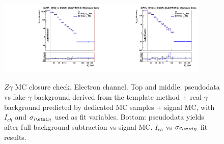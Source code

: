 \begin{figure}[htb]
\begin{center}
\includegraphics[width=0.45\textwidth]{../figs/figs_v11/ELECTRON_ZGamma/PrepareYields/c_BkgSubtrDATAvsSIGMC_c_ELECTRON_ZGamma__UNblind_MCclosure__Barrel__phoEt_MCclosure.pdf}\includegraphics[width=0.45\textwidth]{../figs/figs_v11/ELECTRON_ZGamma/PrepareYields/c_BkgSubtrDATAvsSIGMC_c_ELECTRON_ZGamma__UNblind_MCclosure__Endcap__phoEt_MCclosure.pdf}\\
  \caption{$Z\gamma$ MC closure check. Electron channel. Top and middle: pseudodata vs fake-$\gamma$ background derived from the template method + real-$\gamma$ background predicted by dedicated MC samples + signal MC, with $I_{ch}$ and $\sigma_{i\etai\eta}$ used as fit variables. Bottom: pseudodata yields after full background subtraction vs signal MC. $I_{ch}$ vs $\sigma_{i\etai\eta}$ fit results. }
  \label{fig:DDvsMC_Zg_MCclosure_ELECTRON}
  \end{center}
\end{figure}

\clearpage

